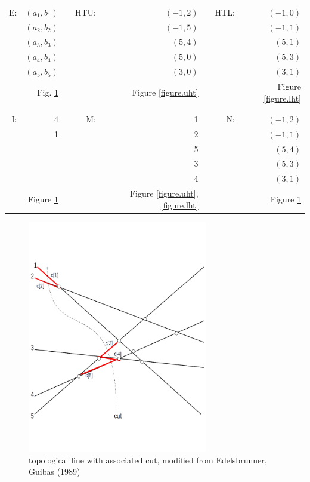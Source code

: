 \documentclass[12pt]{article}
\begin{document}
        \begin{tabular}{rrcrrcrr}
            E:  & $(a_1, b_1)$ &    & HTU:  & $(-1, 2)$ &  & HTL: & $(-1, 0)$ \\ 
                & $(a_2, b_2)$ &    &       & $(-1, 5)$ & &       & $(-1, 1)$\\
                & $(a_3, b_3)$ &    &       & $(5,  4)$ & &       & $(5,  1)$\\
                & $(a_4, b_4)$ &    &       & $(5,  0)$ & &       & $(5,  3)$\\
                & $(a_5, b_5)$ &    &       & $(3,  0)$ & &       & $(3,  1)$\\
                & Fig. \ref{figure.linecut} & & & Figure \ref{figure.uht} & & & Figure \ref{figure.lht} \\
            & & & & & & & \\
            \hline
            & & & & & & & \\
            I:  & 4            &    & M:    & 1         &  & N:   & $(-1, 2)$\\
                & 1            &    &       & 2         &  &      & $(-1, 1)$\\
                &              &    &       & 5         &  &      & $(5,  4)$\\
                &              &    &       & 3         &  &      & $(5,  3)$\\
                &              &    &       & 4         &  &      & $(3,  1)$ \\
                & Figure \ref{figure.linecut} & & & Figure \ref{figure.uht}, \ref{figure.lht} & & & Figure \ref{figure.linecut}
        \end{tabular}

        

        
        \begin{figure}
            \center
            \includegraphics[width=0.7\textwidth]{linecut.png}
            \caption{topological line with associated cut, modified from Edelsbrunner, Guibas (1989)}
            \label{figure.linecut}
        \end{figure}
\end{document}
